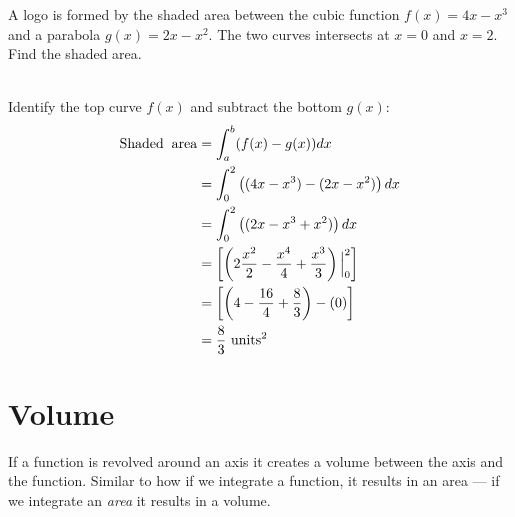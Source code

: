 \clearpage
\example A logo is formed by the shaded area between the cubic function  $ f(x)=4x -x^3$ and a parabola $g(x)=2x-x^2$. The two curves intersects at $x=0$ and $x=2$. Find the shaded area.\\
\begin{multicols}{2}
	\columnbreak
\\	\solution Identify the top curve $f(x)$ and subtract the bottom $g(x)$:
	\begin{align*}
	\mathrm{Shaded \hspace{0.2cm}area}&=\int_{a}^{b}(f(x)-g(x))dx\\
	&=\int_{0}^{2}\left((4x-x^3)-(2x-x^2)\right)dx\\
	&=\int_{0}^{2}\left((2x-x^3+x^2)\right)dx\\
	&=\left[\left(2\frac{x^2}{2}-\frac{x^4}{4}+\frac{x^3}{3} \right)\Big|_{0}^2\right]\\
	&=\left[\left(4-\frac{16}{4}+\frac{8}{3}\right)-(0)\right]\\
	&=\frac{8}{3} \,\, \mathrm{units}^2
	\end{align*}
\end{multicols}

\section{Volume}
If a function is revolved around an axis it creates a volume between the axis and the function. Similar to how if we integrate a function, it results in an area --- if we integrate an \textit{area} it results in a volume.

